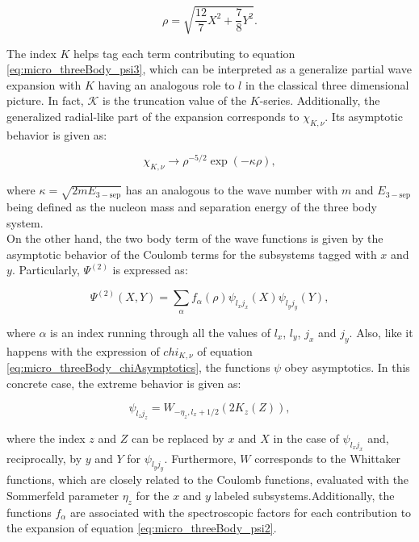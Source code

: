 \documentclass[openany]{book}
\begin{document}
\begin{equation}\label{eq:micro_threeBody_rho}
	\rho = \sqrt{ \frac{12}{7} X^2 + \frac{7}{8} Y^2}.
\end{equation}

The index $K$ helps tag each term contributing to equation \ref{eq:micro_threeBody_psi3}, which can be interpreted as a generalize partial wave expansion with $K$ having an analogous role to $l$ in the classical three dimensional picture. In fact, $\mathcal{K}$ is the truncation value of the $K$-series. Additionally, the generalized radial-like part of the expansion corresponds to  $\chi_{K, \nu}$. Its asymptotic behavior is given as: 

\begin{equation}\label{eq:micro_threeBody_chiAsymptotics}
	\chi_{K, \nu} \rightarrow \rho^{-5/2} \exp{ (- \kappa \rho)},
\end{equation}

where $\kappa = \sqrt{2mE_{\mathrm{3-sep}}}$ has an analogous to the wave number with $m$ and $E_{\mathrm{3-sep}}$ being defined as the nucleon mass and separation energy of the three body system. \\
	
On the other hand, the two body term of the wave functions is given by the asymptotic behavior of the Coulomb terms for the subsystems tagged with $x$ and $y$. Particularly, $\Psi^{(2)}$ is expressed as: 

\begin{equation}\label{eq:micro_threeBody_psi2}
	\Psi^{(2)}(X, Y) =  \sum_{\alpha} {f_\alpha (\rho) \psi_{l_xj_x}(X) \psi_{l_yj_y}(Y) }, 
\end{equation}

where $\alpha$ is an index running through all the values of $l_x$, $l_y$, $j_x$ and $j_y$. Also, like it happens with the expression of $chi_{K, \nu}$ of equation  \ref{eq:micro_threeBody_chiAsymptotics}, the functions $\psi$ obey asymptotics. In this concrete case, the extreme behavior is given as: 

\begin{equation}\label{eq:micro_threeBody_psi2_asymptotic}
	\psi_{l_{z}j_{z}} = W_{-\eta_{z}, l_x + 1/2}(2K_{z}(Z)),
\end{equation}

where the index $z$ and $Z$ can be replaced by $x$ and $X$ in the case of $\psi_{l_{x}j_{x}}$ and, reciprocally, by $y$ and $Y$ for $\psi_{l_{y}j_{y}}$. Furthermore, $W$ corresponds to the Whittaker functions, which are closely related to the Coulomb functions, evaluated with the Sommerfeld parameter $\eta_{z}$ for the $x$ and $y$ labeled subsystems.Additionally, the functions $f_\alpha$ are associated with the spectroscopic factors for each contribution to the expansion of equation \ref{eq:micro_threeBody_psi2}. \\
\end{document}

